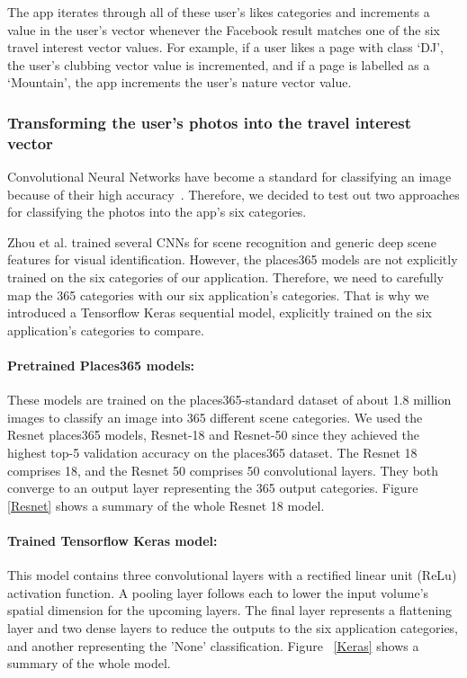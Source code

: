 The app iterates through
all of these user's likes categories and increments a value in the user's
vector whenever the Facebook result matches one of the six travel interest
vector values. For example, if a user likes a page with class `DJ', the user's
clubbing vector value is incremented, and if a page is labelled as a
`Mountain', the app increments the user's nature vector value.

\subsubsection{Transforming the user's photos into the travel interest vector}


Convolutional Neural Networks have become a standard
for classifying an image because of their high
accuracy~\cite{Zhou2018}. Therefore, we decided to test
out two approaches for classifying the photos into the
app's six categories. 

Zhou et al. \cite{Zhou2018} trained several CNNs for
scene recognition and generic deep scene features for
visual identification. However, the places365 models
are not explicitly trained on the six categories of
our application. Therefore, we need to carefully map
the 365 categories with our six application's
categories. That is why we introduced a Tensorflow
Keras sequential model, explicitly trained on the six
application's categories to compare.

\paragraph{Pretrained Places365 models:} These models
are trained on the places365-standard dataset of about
1.8 million images to classify an image into 365
different scene categories. We used the Resnet
places365 models, Resnet-18 and Resnet-50 since they
achieved the highest top-5 validation accuracy on the
places365 dataset. The Resnet 18 comprises 18, and the
Resnet 50 comprises 50 convolutional layers. They both
converge to an output layer representing the 365
output categories.  Figure \ref{Resnet} shows a
summary of the whole Resnet 18 model.

\paragraph{Trained Tensorflow Keras model: } This
model contains three convolutional layers with a
rectified linear unit (ReLu) activation function. A
pooling layer follows each to lower the input volume's
spatial dimension for the upcoming layers. The final
layer represents a flattening layer and two dense
layers to reduce the outputs to the six application
categories, and another representing the 'None'
classification. Figure ~\ref{Keras} shows a summary of
the whole model. 

